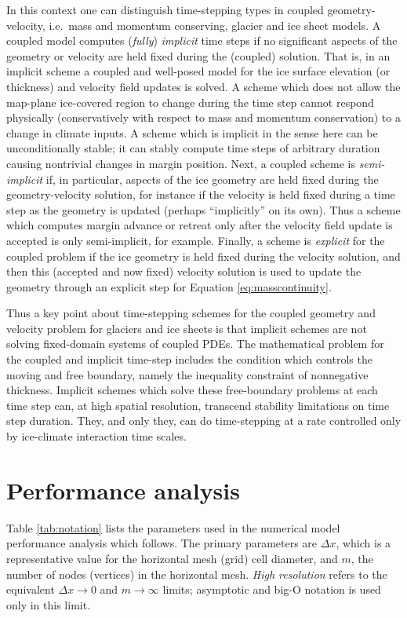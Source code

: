 \documentclass[review,letterpaper]{igs}
\begin{document}
In this context one can distinguish time-stepping types in coupled geometry-velocity, i.e.~mass and momentum conserving, glacier and ice sheet models.  A coupled model computes (\emph{fully}) \emph{implicit} time steps if no significant aspects of the geometry or velocity are held fixed during the (coupled) solution.  That is, in an implicit scheme a coupled and well-posed model for the ice surface elevation (or thickness) and velocity field updates is solved.  A scheme which does not allow the map-plane ice-covered region to change during the time step cannot respond physically (conservatively with respect to mass and momentum conservation) to a change in climate inputs.  A scheme which is implicit in the sense here can be unconditionally stable; it can stably compute time steps of arbitrary duration causing nontrivial changes in margin position.  Next, a coupled scheme is \emph{semi-implicit} if, in particular, aspects of the ice geometry are held fixed during the geometry-velocity solution, for instance if the velocity is held fixed during a time step as the geometry is updated (perhaps ``implicitly'' on its own).  Thus a scheme which computes margin advance or retreat only after the velocity field update is accepted is only semi-implicit, for example.  Finally, a scheme is \emph{explicit} for the coupled problem if the ice geometry is held fixed during the velocity solution, and then this (accepted and now fixed) velocity solution is used to update the geometry through an explicit step for Equation \eqref{eq:masscontinuity}.

Thus a key point about time-stepping schemes for the coupled geometry and velocity problem for glaciers and ice sheets is that implicit schemes are not solving fixed-domain systems of coupled PDEs.  The mathematical problem for the coupled and implicit time-step includes the condition which controls the moving and free boundary, namely the inequality constraint of nonnegative thickness.  Implicit schemes which solve these free-boundary problems at each time step can, at high spatial resolution, transcend stability limitations on time step duration.  They, and only they, can do time-stepping at a rate controlled only by ice-climate interaction time scales.


\section{Performance analysis}

Table \ref{tab:notation} lists the parameters used in the numerical model performance analysis which follows.  The primary parameters are $\Delta x$, which is a representative value for the horizontal mesh (grid) cell diameter, and $m$, the number of nodes (vertices) in the horizontal mesh.  \emph{High resolution} refers to the equivalent $\Delta x\to 0$ and $m\to\infty$ limits; asymptotic and big-O notation is used only in this limit.
\end{document}
